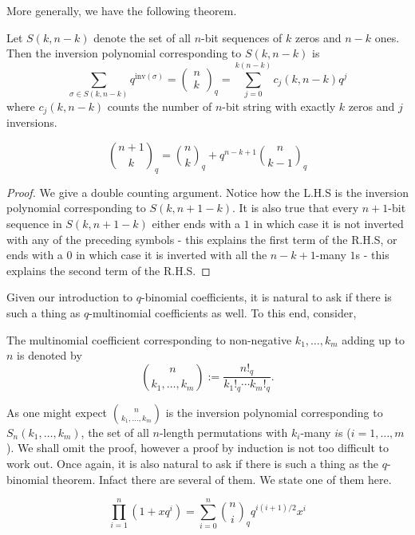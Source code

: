 More generally, we have the following theorem.
\begin{theorem}
Let $S(k,n-k)$ denote the set of all $n$-bit sequences of $k$ zeros and $n-k$ ones. Then the inversion polynomial corresponding to $S(k,n-k)$ is \[\sum_{\sigma\in S(k,n-k)} q^{\text{inv}(\sigma)}=\left(\begin{array}{c}n \\ k \end{array}\right)_q = \sum_{j=0}^{k(n-k)}c_j(k,n-k)q^j\] where $c_j(k,n-k)$ counts the number of $n$-bit string with exactly $k$ zeros and $j$ inversions.
\label{t:FQB}
\end{theorem}
\begin{claim}
\[
    \binom{n+1}{k}_q = \binom{n}{k}_q + q^{n-k+1}\binom{n}{k-1}_q
\]
\label{c:q_Pascal}
\end{claim}
\begin{proof}
We give a double counting argument. Notice how the L.H.S is the inversion polynomial corresponding to $S(k,n+1-k)$. It is also true that every $n+1$-bit sequence in $S(k,n+1-k)$ either ends with a $1$ in which case it is not inverted with any of the preceding symbols - this explains the first term of the R.H.S, or ends with a $0$ in which case it is inverted with all the $n-k+1$-many $1$s - this explains the second term of the R.H.S. 
\end{proof}
Given our introduction to $q$-binomial coefficients, it is natural to ask if there is such a thing as $q$-multinomial coefficients as well. To this end, consider,
\begin{definition}
The multinomial coefficient corresponding to non-negative $k_1,\ldots,k_m$ adding up to $n$ is denoted by
\[
\binom{n}{k_1,\ldots,k_m} := \dfrac{n!_q}{k_1!_q\cdots k_m!_q}.
\]
\end{definition}
As one might expect $\binom{n}{k_1,\ldots,k_m}$ is the inversion polynomial corresponding to $S_n(k_1,\ldots,k_m)$, the set of all $n$-length permutations with $k_i$-many $i$s ($i=1,\ldots,m$). We shall omit the proof, however a proof by induction is not too difficult to work out. Once again, it is also natural to ask if there is such a thing as the $q$-binomial theorem. Infact there are several of them. We state one of them here. 
\begin{theorem}
\[
\prod_{i=1}^{n}(1+xq^i) = \sum_{i=0}^{n}\binom{n}{i}_q q^{i(i+1)/2}x^i
\]
\end{theorem}
